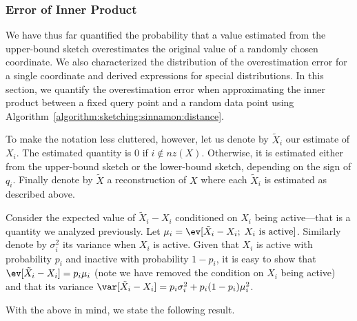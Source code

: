 \subsubsection{Error of Inner Product}
We have thus far quantified the probability that a value estimated
from the upper-bound sketch overestimates the original value of a randomly
chosen coordinate. We also characterized the distribution of the overestimation error
for a single coordinate and derived expressions for special distributions.
In this section, we quantify the overestimation error when approximating
the inner product between a fixed query point and a random data point using
Algorithm~\ref{algorithm:sketching:sinnamon:distance}.

To make the notation less cluttered, however, let us denote by $\tilde{X}_i$
our estimate of $X_i$. The estimated quantity is $0$ if $i \notin \mathit{nz}(X)$.
Otherwise, it is estimated either from the upper-bound sketch or the lower-bound sketch,
depending on the sign of $q_i$. Finally denote by $\tilde{X}$ a reconstruction of $X$
where each $\tilde{X}_i$ is estimated as described above.

Consider the expected value of $\tilde{X}_i - X_i$ conditioned on
$X_i$ being active---that is a quantity we analyzed previously.
Let $\mu_i = \ev[\tilde{X}_i - X_i; \; X_i \text{ is active}]$.
Similarly denote by $\sigma_i^2$ its variance when $X_i$ is active.
Given that $X_i$ is active with probability $p_i$ and inactive with probability $1 - p_i$,
it is easy to show that $\ev[\tilde{X}_i - X_i] = p_i \mu_i$ (note we have removed
the condition on $X_i$ being active)
and that its variance $\var[\tilde{X}_i - X_i] = p_i \sigma_i^2 + p_i (1 - p_i) \mu_i^2$.

With the above in mind, we state the following result.

